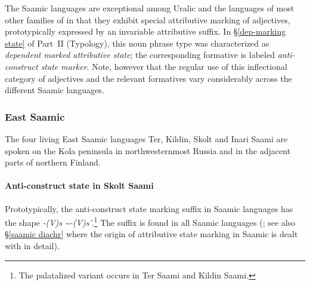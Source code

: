 The Saamic languages are exceptional among Uralic and the languages of most other families of  in that they exhibit special attributive marking of adjectives, prototypically expressed by an invariable attributive suffix. In \S\ref{dep-marking state} of Part~II (Typology), this noun phrase type was characterized as \textit{dependent marked attributive state}; the corresponding formative is labeled \textit{anti\hyp{}construct state marker}. Note, however that the regular use of this inflectional category of adjectives and the relevant formatives vary considerably across the different Saamic languages.

\subsubsection{East Saamic}
The four living East Saamic languages Ter, Kildin, Skolt and Inari Saami are spoken on the Kola peninsula in northwesternmost Russia and in the adjacent parts of northern Finland.

\paragraph*{Anti\hyp{}construct state in Skolt Saami}\hspace{0.4cm}
Prototypically, the anti\hyp{}construct state marking suffix in Saamic languages has the shape \textit{-(V)s \textasciitilde-(V)s'}.\footnote{The palatalized variant occurs in Ter Saami and Kildin Saami.} The suffix is found in all Saamic languages (\citealt{riesler2006b}; see also \S\ref{saamic diachr} where the origin of attributive state marking in Saamic is dealt with in detail). 


